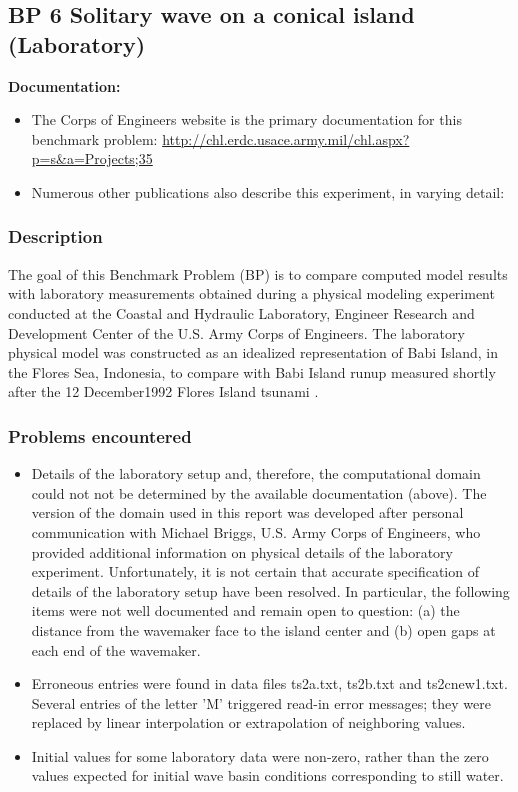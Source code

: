 \subsection{BP 6
  Solitary wave on a conical island (Laboratory)}

{\bf Documentation:}
\begin {itemize}

\item The Corps of Engineers website is the primary documentation for this benchmark problem:
\url{http://chl.erdc.usace.army.mil/chl.aspx?p=s&a=Projects;35}
\item Numerous other publications also describe this experiment, in varying detail: \cite{SynolakisBernard:pmel135, Briggs1994, Liu1994, Briggs1995, Liu1995, Briggs1996, Fujima2000}
\end{itemize} 

\subsubsection{Description}
The goal of this Benchmark Problem (BP) is to compare computed model results with laboratory measurements obtained during a physical modeling experiment conducted at the Coastal and Hydraulic Laboratory, Engineer Research and Development Center of the U.S. Army Corps of Engineers.  The laboratory physical model was constructed as an idealized representation of Babi Island, in the Flores Sea, Indonesia, to compare with Babi Island runup measured shortly after the 12 December1992 Flores Island tsunami \cite{Yeh1994}.

\subsubsection {Problems encountered}

\begin {itemize}
\item Details of the laboratory setup and, therefore, the computational domain could not not be determined by the available documentation (above).  The version of the domain used in this report was developed after personal communication with Michael Briggs, U.S. Army Corps of Engineers, who  provided additional information on physical details of the laboratory experiment.  Unfortunately, it is not certain that accurate specification of details of the laboratory setup have been resolved.  In particular, the following items were not well documented and remain open to question: (a) the distance from the wavemaker face to the island center and (b) open gaps at each end of the wavemaker.
\item Erroneous entries were found in data files ts2a.txt, ts2b.txt and ts2cnew1.txt.  Several entries of the letter 'M' triggered read-in error messages; they were replaced by linear interpolation or extrapolation of neighboring values.
\item Initial values for some laboratory data were non-zero, rather than the zero values expected for initial wave basin conditions corresponding to still water. 
\end{itemize} 


